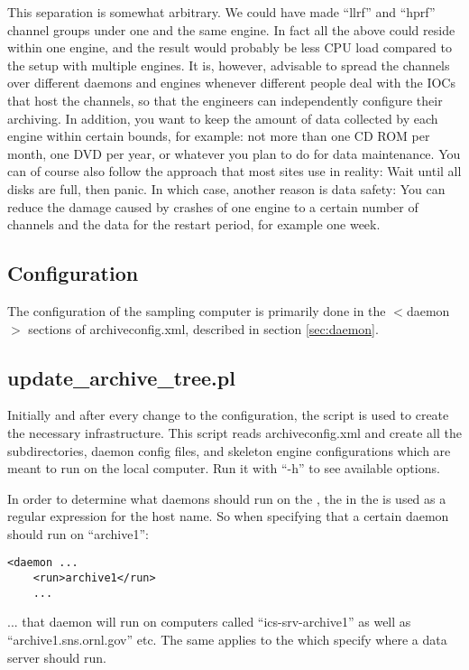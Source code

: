 This separation is somewhat arbitrary. We could have made ``llrf'' and
``hprf'' channel groups under one and the same engine. In fact all the
above could reside within one engine, and the result would probably be
less CPU load compared to the setup with multiple engines.  It is,
however, advisable to spread the channels over different daemons and
engines whenever different people deal with the IOCs that host the
channels, so that the engineers can independently configure their
archiving.  In addition, you want to keep the amount of data collected
by each engine within certain bounds, for example: not more than one
CD ROM per month, one DVD per year, or whatever you plan to do for
data maintenance. You can of course also follow the approach that most
sites use in reality: Wait until all disks are full, then panic.
In which case, another reason is data safety: You can reduce the
damage caused by crashes of one engine to a certain number of channels
and the data for the restart period, for example one week.

\subsection{Configuration}
The configuration of the sampling computer is primarily done
in the $<$daemon$>$ sections of archiveconfig.xml, described in
section \ref{sec:daemon}.

\subsection{update\_archive\_tree.pl}
Initially and after every change to the configuration,
the  script is used to create the necessary
infrastructure.
This script reads archiveconfig.xml and create all the subdirectories,
daemon config files, and skeleton engine configurations which are
meant to run on the local computer.
Run it with ``-h'' to see available options.

\NOTE In order to determine what daemons should run on the
,
the  in the  is used as a
regular expression for the host name.
So when specifying that a certain daemon should run on ``archive1'':
\begin{lstlisting}[keywordstyle=\sffamily]
 <daemon ...
    <run>archive1</run>
    ...
\end{lstlisting}
... that daemon will run on computers called ``ics-srv-archive1'' as well
as ``archive1.sns.ornl.gov'' etc.
The same applies to the  which specify where a
data server should run.

